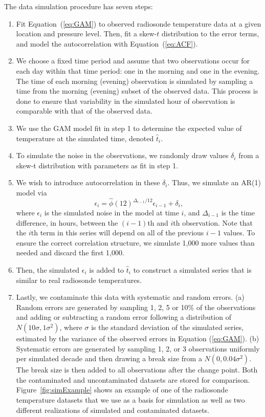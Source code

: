 \documentclass[12pt]{article}
\begin{document}
\begin{doublespacing}
The data simulation procedure has seven steps:
\begin{enumerate}
	\item Fit Equation~(\ref{eq:GAM}) to observed radiosonde temperature data at a given location and pressure level.  Then, fit a skew-$t$ distribution to the error terms, and model the autocorrelation with Equation~(\ref{eq:ACF}).
	\item We choose a fixed time period and assume that two observations occur for each day within that time period: one in the morning and one in the evening.  The time of each morning (evening) observation is simulated by sampling a time from the morning (evening) subset of the observed data.  This process is done to ensure that variability in the simulated hour of observation is comparable with that of the observed data.
	\item We use the GAM model fit in step 1 to determine the expected value of temperature at the simulated time, denoted $\hat t_i$.
	\item To simulate the noise in the observations, we randomly draw values $\delta_i$ from a skew-t distribution with parameters as fit in step 1.
	\item We wish to introduce autocorrelation in these $\delta_i$.  Thus, we simulate an AR(1) model via
	\begin{equation*}
	\epsilon_i = \widehat{\phi}(12)^{\Delta_{i-1}/12} \epsilon_{i-1} + \delta_i,
	\end{equation*}
	where $\epsilon_i$ is the simulated noise in the model at time $i$, and $\Delta_{i-1}$ is the time difference, in hours, between the $(i-1)$th and $i$th observation.  Note that the $i$th term in this series will depend on all of the previous $i-1$ values.  To ensure the correct correlation structure, we simulate 1,000 more values than needed and discard the first 1,000.
	\item Then, the simulated $\epsilon_i$ is added to $\hat{t}_i$ to construct a simulated series that is similar to real radiosonde temperatures.

	\item Lastly, we contaminate this data with systematic and random errors.  (a) Random errors are generated by sampling 1, 2, 5 or 10\% of the observations and adding or subtracting a random error following a distribution of $N(10\sigma,1\sigma^2)$, where $\sigma$ is the standard deviation of the simulated series, estimated by the variance of the observed errors in Equation (\ref{eq:GAM}).  (b) Systematic errors are generated by sampling 1, 2, or 3 observations uniformly per simulated decade and then drawing a break size from a $N(0,0.04 \sigma^2)$.  The break size is then added to all observations after the change point.  Both the contaminated and uncontaminated datasets are stored for comparison.  Figure~\ref{fig:simExample} shows an example of one of the radiosonde temperature datasets that we use as a basis for simulation as well as two different realizations of simulated and contaminated datasets.
\end{enumerate}


\end{doublespacing}
\end{document}
